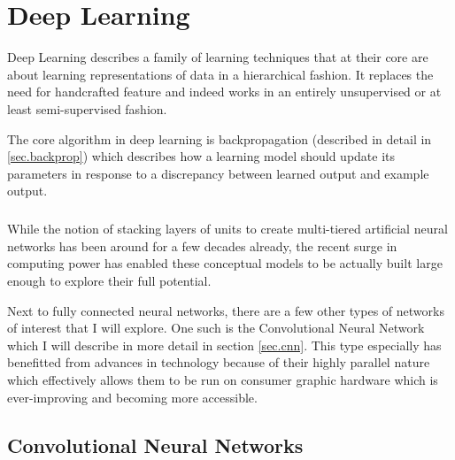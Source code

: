\chapter{Deep Learning}
Deep Learning describes a family of learning techniques
that at their core are about learning representations of data
in a hierarchical fashion.
It replaces the need for handcrafted feature
and indeed works in an entirely unsupervised or at least
semi-supervised fashion.

The core algorithm in deep learning is backpropagation
(described in detail in \ref{sec.backprop})
which describes how a learning model should update its parameters
in response to a discrepancy between learned output
and example output.

\paragraph{}
While the notion of stacking layers of units
to create multi-tiered artificial neural networks
has been around for a few decades already,
the recent surge in computing power
has enabled these conceptual models
to be actually built large enough
to explore their full potential.

Next to fully connected neural networks,
there are a few other types of networks of interest
that I will explore.
One such is the Convolutional Neural Network
which I will describe in more detail in
section \ref{sec.cnn}.
This type especially has benefitted from
advances in technology because of their highly
parallel nature which effectively allows them to be run
on consumer graphic hardware which is ever-improving
and becoming more accessible.

\paragraph{}

\section{Convolutional Neural Networks}

